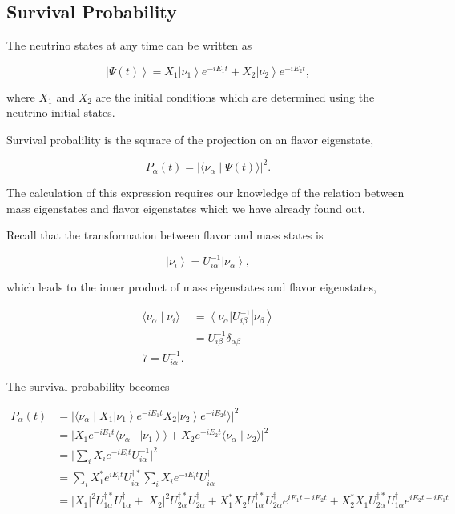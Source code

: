 \documentclass{tufte-handout}
\newcommand{\bra}[1]{\left\langle #1\right|}
\newcommand{\ket}[1]{\left| #1\right\rangle}
\newcommand{\braket}[2]{\langle #1 \mid #2 \rangle}
\begin{document}
\subsection{Survival Probability}


The neutrino states at any time can be written as

\begin{equation}
\ket{\Psi(t)}  = X_1 \ket{\nu_1 } e^{-i E_1 t}+ X_2 \ket{ \nu_2 } e^{-i E_2 t},
\end{equation}

where $X_1$ and $X_2$ are the initial conditions which are determined using the neutrino initial states.

Survival probalility is the squrare of the projection on an flavor eigenstate,

\begin{equation}
P_{\alpha}(t) = \lvert \braket{\nu_{\alpha}}{\Psi(t)} \rvert^2.
\end{equation}

The calculation of this expression requires our knowledge of the relation between mass eigenstates and flavor eigenstates which we have already found out.

Recall that the transformation between flavor and mass states is

\begin{equation}
\ket{\nu_i} = U^{-1}_{i\alpha} \ket{\nu_\alpha},
\end{equation}

which leads to the inner product of mass eigenstates and flavor eigenstates,

\begin{align}
\braket{\nu_\alpha}{\nu_i} &= \bra{\nu_\alpha} U^{-1}_{i\beta} \ket{\nu_\beta} \\
& = U^{-1}_{i\beta}\delta_{\alpha\beta} \\
7 = U^{-1}_{i\alpha}.
\end{align}


The survival probability becomes

\begin{align*}
P_\alpha (t) &= \lvert \braket{\nu_\alpha}{ X_1 \ket{\nu_1 } e^{-i E_1 t} X_2 \ket{ \nu_2 } e^{-i E_2 t} }  \rvert^2 \\
& = \lvert  X_1 e^{-i E_1 t} \braket{\nu_\alpha}{\ket{\nu_1} } + X_2 e^{-i E_2 t} \braket{ \nu_\alpha }{ \nu_2 } \rvert^2 \\
& = \lvert \sum_i X_i e^{-i E_i t} U^{-1}_{i \alpha}  \rvert ^2 \\
& = \sum_i X_1^* e^{iE_i t} U^{\dagger *}_{i\alpha} \sum_i X_i e^{-i E_i t} U^\dagger_{i \alpha} \\
& = \lvert X_1 \rvert^2 U^{\dagger *}_{1\alpha} U^\dagger_{1\alpha} + \lvert X_2 \rvert^2 U^{\dagger *}_{2\alpha} U^\dagger_{2\alpha}  + X_1^* X_2 U^{\dagger *}_{1\alpha} U^\dagger_{2\alpha} e^{i E_1 t - i E_2 t} + X_2^* X_1 U^{\dagger *}_{2\alpha} U^\dagger_{1\alpha} e^{i E_2 t - i E_1 t}
\end{align*}
\end{document}
